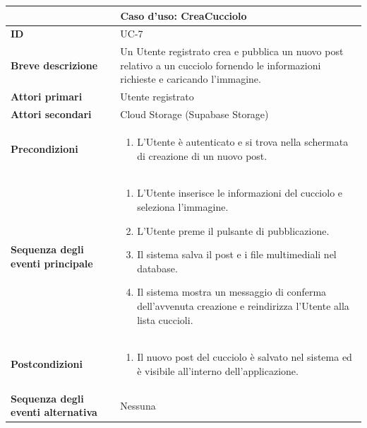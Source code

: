 \documentclass[a4paper]{report}
\begin{document}
\begin{table}[H]
\vspace*{-0cm}
\renewcommand{\arraystretch}{1.9}
\begin{tabular}{|p{3.9cm}|p{9.9cm}|}
\hline
\multicolumn{2}{|c|}{\textbf{Caso d’uso: CreaCucciolo}} \\ \hline
\textbf{ID} & UC-7 \\ \hline
\textbf{Breve descrizione} & Un Utente registrato crea e pubblica un nuovo post relativo a un cucciolo fornendo le informazioni richieste e caricando l'immagine. \\ \hline
\textbf{Attori primari} & Utente registrato \\ \hline
\textbf{Attori secondari} & Cloud Storage (Supabase Storage) \\ \hline
\textbf{Precondizioni} & \begin{enumerate}[leftmargin=14pt,label=\arabic*.,labelsep=0.5em,topsep=0pt,partopsep=0pt,parsep=0pt,itemsep=0pt]
   \item L'Utente è autenticato e si trova nella schermata di creazione di un nuovo post.
\end{enumerate} \\ \hline
\textbf{Sequenza degli eventi principale} &
\begin{enumerate}[leftmargin=14pt,label=\arabic*.,labelsep=0.5em,topsep=0pt,partopsep=0pt,parsep=0pt,itemsep=0pt]
  \item L'Utente inserisce le informazioni del cucciolo e seleziona l’immagine.
  \item L'Utente preme il pulsante di pubblicazione.
  \item Il sistema salva il post e i file multimediali nel database.
  \item Il sistema mostra un messaggio di conferma dell'avvenuta creazione e reindirizza l'Utente alla lista cuccioli.
\end{enumerate}\\ \hline
\textbf{Postcondizioni} &
\begin{enumerate}[leftmargin=14pt,label=\arabic*.,labelsep=0.5em,topsep=0pt,partopsep=0pt,parsep=0pt,itemsep=0pt]
\item Il nuovo post del cucciolo è salvato nel sistema ed è visibile all'interno dell'applicazione.
\end{enumerate} \\ \hline
\textbf{Sequenza degli eventi alternativa} & Nessuna \\ \hline
\end{tabular}
\end{table}
\end{document}
